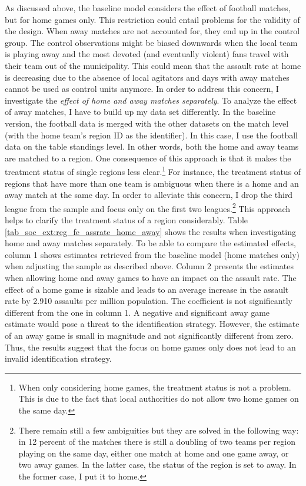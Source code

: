 As discussed above, the baseline model considers the effect of football matches, but for home games only. This restriction could entail problems for the validity of the design. When away matches are not accounted for, they end up in the control group. The control observations might be biased downwards when the local team is playing away and the most devoted (and eventually violent) fans travel with their team out of the municipality. This could mean that the assault rate at home is decreasing due to the absence of local agitators and days with away matches cannot be used as control units anymore. In order to address this concern, I investigate the \textit{effect of home and away matches separately}. To analyze the effect of away matches, I have to build up my data set differently. In the baseline version, the football data is merged with the other datasets on the match level (with the home team's region ID as the identifier). In this case, I use the football data on the table standings level. In other words, both the home and away teams are matched to a region. One consequence of this approach is that it makes the treatment status of single regions less clear.\footnote{When only considering home games, the treatment status is not a problem. This is due to the fact that local authorities do not allow two home games on the same day.} For instance, the treatment status of regions that have more than one team is ambiguous when there is a home and an away match at the same day. In order to alleviate this concern, I drop the third league from the sample and focus only on the first two leagues.\footnote{There remain still a few ambiguities but they are solved in the following way: in 12 percent of the matches there is still a doubling of two teams per region playing on the same day, either one match at home and one game away, or two away games. In the latter case, the status of the region is set to away. In the former case, I put it to home.} This approach helps to clarify the treatment status of a region considerably. Table \ref{tab_soc_ext:reg_fe_assrate_home_away} shows the results when investigating home and away matches separately. To be able to compare the estimated effects, column 1 shows estimates retrieved from the baseline model (home matches only) when adjusting the sample as described above. Column 2 presents the estimates when allowing home and away games to have an impact on the assault rate. The effect of a home game is sizable and leads to an average increase in the assault rate by 2.910 assaults per million population. The coefficient is not significantly different from the one in column 1. A negative and significant away game estimate would pose a threat to the identification strategy. However, the estimate of an away game is small in magnitude and not significantly different from zero. Thus, the results suggest that the focus on home games only does not lead to an invalid identification strategy. 





